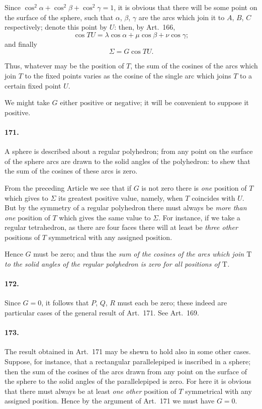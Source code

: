 \documentclass{book}[2004/02/16]
\begin{document}
\begin{mainmatter}
\begin{spacing}{1.3}
Since $\cos^2\alpha +\cos^2\beta+\cos^2\gamma = 1$, it is obvious that there will be
some point on the surface of the sphere, such that $\alpha$, $\beta$, $\gamma$ are the
arcs which join it to $A$, $B$, $C$ respectively; denote this point by
$U$: then, by Art.~166,
\[
\cos TU= \lambda \cos \alpha + \mu \cos \beta + \nu \cos \gamma;
\]
and finally
\[
\Sigma=G \cos TU.
\]

Thus, whatever may be the position of $T$, the sum of the cosines
of the arcs which join $T$ to the fixed points varies as the cosine
of the single arc which joins $T$ to a certain fixed point $U$.

We might take $G$ either positive or negative; it will be
convenient to suppose it positive.

\paragraph{171.} A sphere is described about a regular polyhedron;
from any point on the surface of the sphere arcs are drawn to the
solid angles of the polyhedron: to shew that the sum of the cosines
of these arcs is zero.

From the preceding Article we see that if $G$ is not zero
there is \textit{one} position of $T$ which gives to $\Sigma$ its greatest positive
value, namely, when $T$ coincides with $U$. But by the symmetry
of a regular polyhedron there must always be \textit{more than one} position
of $T$ which gives the same value to $\Sigma$. For instance, if we
take a regular tetrahedron, as there are four faces there will at
least be \textit{three other} positions of $T$ symmetrical with any assigned
position.

Hence $G$ must be zero; and thus the \textit{sum of the cosines of the
arcs which join $\mathrm{T}$ to the solid angles of the regular polyhedron is
zero for all positions of $\mathrm{T}$.}

\paragraph{172.} Since $G=0$, it follows that $P$, $Q$, $R$ must each be zero;
these indeed are particular cases of the general result of Art.\ 171.
See Art.\ 169.

\paragraph{173.} The result obtained in Art.\ 171 may be shewn to hold
also in some other cases. Suppose, for instance, that a rectangular
parallelepiped is inscribed in a sphere; then the sum of the
cosines of the arcs drawn from any point on the surface of the
sphere to the solid angles of the parallelepiped is zero. For here
it is obvious that there must always be at least \textit{one other} position
of $T$ symmetrical with any assigned position. Hence by the
argument of Art.\ 171 we must have $G = 0$.


\end{spacing}
\end{mainmatter}
\end{document}
